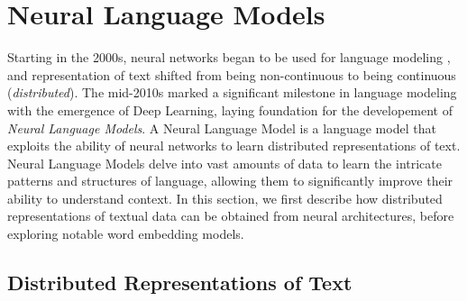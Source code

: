 
\section{Neural Language Models}

Starting in the 2000s, neural networks began to be used for language modeling \citep{bengio2000neural}, and representation of text shifted from being non-continuous to being continuous (\textit{distributed}). The mid-2010s marked a significant milestone in language modeling with the emergence of Deep Learning, laying foundation for the developement of \textit{Neural Language Models}. A Neural Language Model is a language model that exploits the ability of neural networks to learn distributed representations of text. Neural Language Models delve into vast amounts of data to learn the intricate patterns and structures of language, allowing them to significantly improve their ability to understand context. In this section, we first describe how distributed representations of textual data can be obtained from neural architectures, before exploring notable word embedding models.




\subsection{Distributed Representations of Text}

